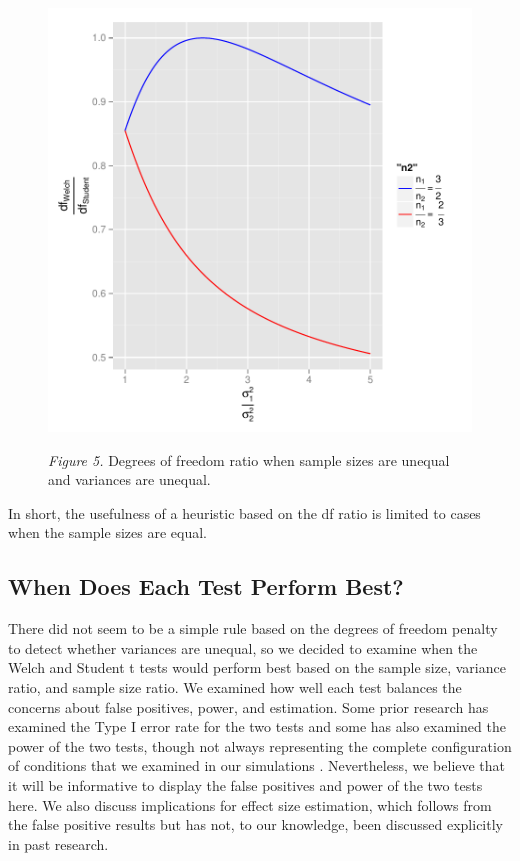 \documentclass[man,a4paper,noextraspace,apacite]{apa6}
\begin{document}
\begin{figure}
\includegraphics{WelchManuscript-abridged-dfratiosDiffvarsDiffNratios}

\textit{Figure 5.} Degrees of freedom ratio when sample sizes are unequal and variances are unequal.
\end{figure}
    In short, the usefulness of a heuristic based on the df ratio is limited to cases when the sample sizes are equal. 

\subsection{When Does Each Test Perform Best?}
    There did not seem to be a simple rule based on the degrees of freedom penalty to detect whether variances are unequal, so we decided to examine when the Welch and Student t tests would perform best based on the sample size, variance ratio, and sample size ratio. We examined how well each test balances the concerns about false positives, power, and estimation. Some prior research has examined the Type I error rate for the two tests \cite{Boneau1960, Zimmerman1993, Zimmerman2004, Zimmerman1996, Zimmerman2009} and some has also examined the power of the two tests, though not always representing the complete configuration of conditions that we examined in our simulations \cite{Neuhauser2002, Zimmerman1993}. Nevertheless, we believe that it will be informative to display the false positives and power of the two tests here. We also discuss implications for effect size estimation, which follows from the false positive results but has not, to our knowledge, been discussed explicitly in past research.
    
\end{document}
